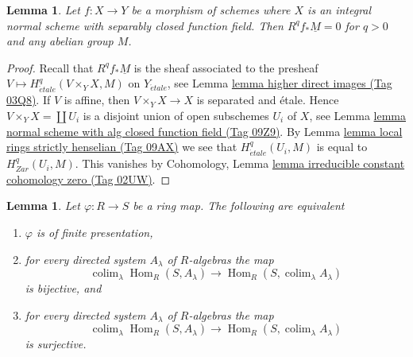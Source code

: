 \documentclass{amsart}
\theoremstyle{plain}
\newtheorem{lemma}[subsection]{Lemma}
\theoremstyle{definition}
\theoremstyle{remark}
\numberwithin{equation}{subsection}
\def\colim{\mathop{\mathrm{colim}}\nolimits}
\def\Hom{\mathop{\mathrm{Hom}}\nolimits}
\def\etale{{\acute{e}tale}}
\begin{document}
\begin{lemma}
\label{lemma-Rf-star-zero-normal-with-alg-closed-function-field}
Let $f : X \to Y$ be a morphism of schemes where $X$ is an integral
normal scheme with separably closed function field. Then
$R^qf_*\underline{M} = 0$ for $q > 0$ and any abelian group $M$.
\end{lemma}

\begin{proof}
Recall that $R^qf_*\underline{M}$ is the sheaf associated
to the presheaf $V \mapsto H^q_\etale(V \times_Y X, M)$ on $Y_\etale$, see
Lemma \href{https://stacks.math.columbia.edu/tag/03Q8}{lemma higher direct images (Tag 03Q8)}.
If $V$ is affine, then $V \times_Y X \to X$ is separated and \'etale.
Hence $V \times_Y X = \coprod U_i$ is a disjoint union of open
subschemes $U_i$ of $X$, see
Lemma \href{https://stacks.math.columbia.edu/tag/09Z9}{lemma normal scheme with alg closed function field (Tag 09Z9)}.
By Lemma \href{https://stacks.math.columbia.edu/tag/09AX}{lemma local rings strictly henselian (Tag 09AX)}
we see that $H^q_\etale(U_i, M)$ is equal to
$H^q_{Zar}(U_i, M)$. This vanishes by
Cohomology, Lemma \href{https://stacks.math.columbia.edu/tag/02UW}{lemma irreducible constant cohomology zero (Tag 02UW)}.
\end{proof}


\begin{lemma}
\label{algebra-lemma-characterize-finite-presentation}
Let $\varphi : R \to S$ be a ring map. The following are equivalent
\begin{enumerate}
\item $\varphi$ is of finite presentation,
\item for every directed system $A_\lambda$ of $R$-algebras
the map
$$
\colim_\lambda \Hom_R(S, A_\lambda) \longrightarrow
\Hom_R(S, \colim_\lambda A_\lambda)
$$
is bijective, and
\item for every directed system $A_\lambda$ of $R$-algebras
the map
$$
\colim_\lambda \Hom_R(S, A_\lambda) \longrightarrow
\Hom_R(S, \colim_\lambda A_\lambda)
$$
is surjective.
\end{enumerate}
\end{lemma}
\end{document}
